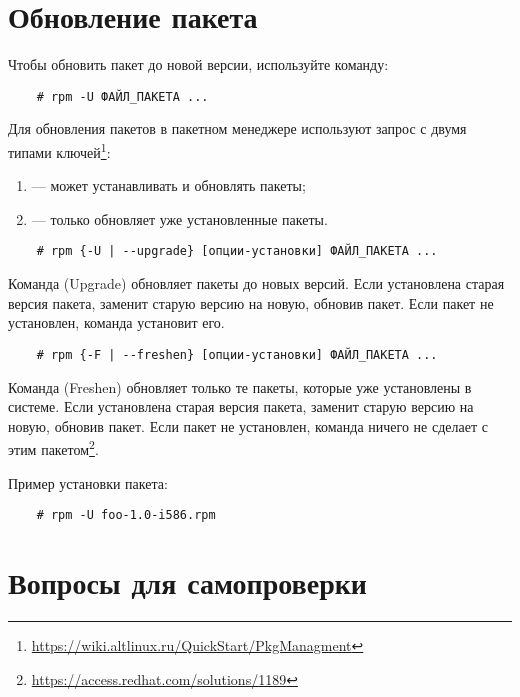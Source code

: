 \section{Обновление пакета}
Чтобы обновить пакет до новой версии, используйте команду:
\begin{verbatim}
    # rpm -U ФАЙЛ_ПАКЕТА ...
\end{verbatim}

Для обновления пакетов в пакетном менеджере  используют запрос с двумя типами ключей\footnote{\href{https://wiki.altlinux.ru/QuickStart/PkgManagment}{https://wiki.altlinux.ru/QuickStart/PkgManagment}}:
\begin{enumerate}
	\item {} --- может устанавливать и обновлять пакеты;
	\item {} --- только обновляет уже установленные пакеты.
\end{enumerate}

\begin{verbatim}
    # rpm {-U | --upgrade} [опции-установки] ФАЙЛ_ПАКЕТА ...
\end{verbatim}

Команда  (Upgrade) обновляет пакеты до новых версий. Если установлена старая версия пакета,  заменит старую версию на новую, обновив пакет. Если пакет не установлен, команда  установит его.

\begin{verbatim}
    # rpm {-F | --freshen} [опции-установки] ФАЙЛ_ПАКЕТА ...
\end{verbatim}

Команда  (Freshen) обновляет только те пакеты, которые уже установлены в системе. Если установлена старая версия пакета,  заменит старую версию на новую, обновив пакет. Если пакет не установлен, команда  ничего не сделает с этим пакетом\footnote{\href{https://access.redhat.com/solutions/1189}{https://access.redhat.com/solutions/1189}}.

Пример установки пакета:
\begin{verbatim}
    # rpm -U foo-1.0-i586.rpm
\end{verbatim}


\section{Вопросы для самопроверки}

